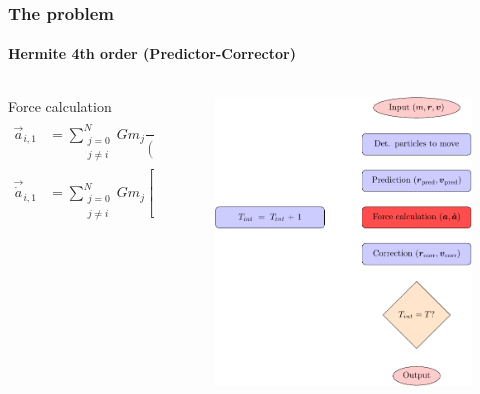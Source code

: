 \begin{frame}
    \frametitle{The {\nbody} problem}
    \framesubtitle{Hermite 4th order (Predictor-Corrector)}
    \begin{columns}
        \begin{column}{0.6\textwidth}
            \begin{block}{Force calculation}
                \footnotesize
                \begin{align*}
                    \vec{a}_{i,1} &= \sum_{\substack{j=0\\j\neq i}}^{N} G m_{j}
                                    \frac{\vec{r}_{ij}}
                                           {(r_{ij}^2 + \epsilon^{2})^{\frac{3}{2}}}, \\
                    \vec{\dot{a}}_{i,1} &= \sum_{\substack{j=0\\j\neq i}}^{N} G m_{j}
                                    \left[
                                        \frac{\vec{v}_{ij}}
                                            {(r_{ij}^2 + \epsilon^{2})^{\frac{3}{2}}} -
                                        \frac{3(\vec{v}_{ij}\cdot \vec{r}_{ij}) \vec{r}_{i}}
                                            {(r_{ij}^2 + \epsilon^{2})^{\frac{5}{2}}}
                                    \right],
                \end{align*}
            \end{block}
        \end{column}
        \begin{column}{0.4\textwidth}
            \begin{figure}
                \centering
                \includegraphics[height=0.55\textheight]{img/algorithm2}

\end{figure}
\end{column}
\end{columns}
\end{frame}
